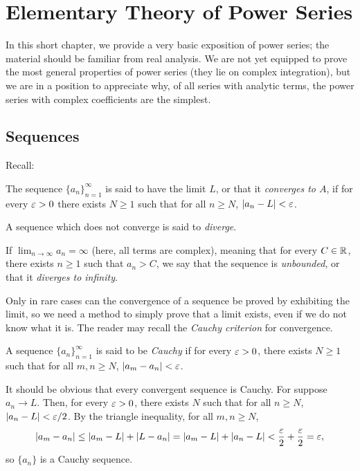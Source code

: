 \chapter{Elementary Theory of Power Series}
\label{chap:power-series}
In this short chapter, we provide a very basic exposition of power series; the material should be familiar from real analysis. We are not yet equipped to prove the most general properties of power series (they lie on complex integration), but we are in a position to appreciate why, of all series with analytic terms, the power series with complex coefficients are the simplest.

\section{Sequences}
Recall:
\begin{definition}
	The sequence $\{a_n\}_{n=1}^{\infty}$ is said to have the limit $L$, or that it \emph{converges to $A$}, if for every $\varepsilon>0$ there exists $N \ge 1$ such that for all $n \ge N$, $\lvert a_n-L \rvert<\varepsilon$.
	
	A sequence which does not converge is said to \emph{diverge}.
	
	If $\lim_{n \rightarrow \infty}a_n=\infty$ (here, all terms are complex), meaning that for every $C \in \mathbb R$, there exists $n \ge 1$ such that $a_n>C$, we say that the sequence is \emph{unbounded}, or that it \emph{diverges to infinity}. 
\end{definition}

Only in rare cases can the convergence of a sequence be proved by exhibiting the limit, so we need a method to simply prove that a limit exists, even if we do not know what it is. The reader may recall the \textit{Cauchy criterion} for convergence.

\begin{definition}
	A sequence $\{a_n\}_{n=1}^{\infty}$ is said to be \emph{Cauchy} if for every $\varepsilon>0$, there exists $N \ge 1$ such that for all $m,n \ge N$, $\lvert a_m-a_n \rvert<\varepsilon$.
\end{definition}

It should be obvious that every convergent sequence is Cauchy. For suppose $a_n \rightarrow L$. Then, for every $\varepsilon>0$, there exists $N$ such that for all $n \ge N$, $\lvert a_n-L \rvert<\varepsilon/2$. By the triangle inequality, for all $m,n \ge N$, $$\lvert a_m-a_n \rvert \le \lvert a_m-L \rvert+\lvert L-a_n \rvert=\lvert a_m-L \rvert+\lvert a_n-L \rvert<\dfrac{\varepsilon}{2}+\dfrac{\varepsilon}{2}=\varepsilon,$$ so $\{a_n\}$ is a Cauchy sequence.

